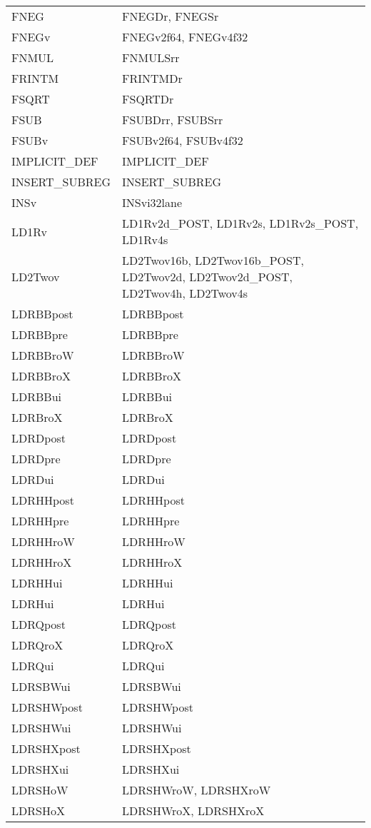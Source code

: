 \begin{xltabular}{\textwidth}{lX}
    FNEG & FNEGDr, FNEGSr \\
    FNEGv & FNEGv2f64, FNEGv4f32 \\
    FNMUL & FNMULSrr \\
    FRINTM & FRINTMDr \\
    FSQRT & FSQRTDr \\
    FSUB & FSUBDrr, FSUBSrr \\
    FSUBv & FSUBv2f64, FSUBv4f32 \\
    IMPLICIT\_DEF & IMPLICIT\_DEF \\
    INSERT\_SUBREG & INSERT\_SUBREG \\
    INSv & INSvi32lane \\
    LD1Rv & LD1Rv2d\_POST, LD1Rv2s, LD1Rv2s\_POST, LD1Rv4s \\
    LD2Twov & LD2Twov16b, LD2Twov16b\_POST, LD2Twov2d, LD2Twov2d\_POST, LD2Twov4h, LD2Twov4s \\
    LDRBBpost & LDRBBpost \\
    LDRBBpre & LDRBBpre \\
    LDRBBroW & LDRBBroW \\
    LDRBBroX & LDRBBroX \\
    LDRBBui & LDRBBui \\
    LDRBroX & LDRBroX \\
    LDRDpost & LDRDpost \\
    LDRDpre & LDRDpre \\
    LDRDui & LDRDui \\
    LDRHHpost & LDRHHpost \\
    LDRHHpre & LDRHHpre \\
    LDRHHroW & LDRHHroW \\
    LDRHHroX & LDRHHroX \\
    LDRHHui & LDRHHui \\
    LDRHui & LDRHui \\
    LDRQpost & LDRQpost \\
    LDRQroX & LDRQroX \\
    LDRQui & LDRQui \\
    LDRSBWui & LDRSBWui \\
    LDRSHWpost & LDRSHWpost \\
    LDRSHWui & LDRSHWui \\
    LDRSHXpost & LDRSHXpost \\
    LDRSHXui & LDRSHXui \\
    LDRSHoW & LDRSHWroW, LDRSHXroW \\
    LDRSHoX & LDRSHWroX, LDRSHXroX \\

\end{xltabular}
